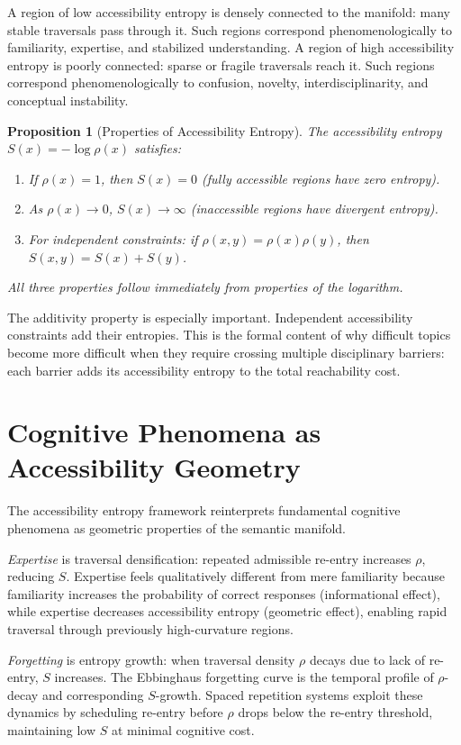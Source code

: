 \documentclass[12pt,oneside]{book}
\theoremstyle{plain}
\newtheorem{proposition}[theorem]{Proposition}
\theoremstyle{definition}
\theoremstyle{plain}
\begin{document}
A region of low accessibility entropy is densely connected to the manifold: many stable traversals pass through it. Such regions correspond phenomenologically to familiarity, expertise, and stabilized understanding. A region of high accessibility entropy is poorly connected: sparse or fragile traversals reach it. Such regions correspond phenomenologically to confusion, novelty, interdisciplinarity, and conceptual instability.

\begin{proposition}[Properties of Accessibility Entropy]
The accessibility entropy $S(x) = -\log\rho(x)$ satisfies:
\begin{enumerate}[noitemsep]
\item If $\rho(x) = 1$, then $S(x) = 0$ (fully accessible regions have zero entropy).
\item As $\rho(x) \to 0$, $S(x) \to \infty$ (inaccessible regions have divergent entropy).
\item For independent constraints: if $\rho(x,y) = \rho(x)\rho(y)$, then $S(x,y) = S(x) + S(y)$.
\end{enumerate}
All three properties follow immediately from properties of the logarithm.
\end{proposition}

The additivity property is especially important. Independent accessibility constraints add their entropies. This is the formal content of why difficult topics become more difficult when they require crossing multiple disciplinary barriers: each barrier adds its accessibility entropy to the total reachability cost.

\section{Cognitive Phenomena as Accessibility Geometry}

The accessibility entropy framework reinterprets fundamental cognitive phenomena as geometric properties of the semantic manifold.

\emph{Expertise} is traversal densification: repeated admissible re-entry increases $\rho$, reducing $S$. Expertise feels qualitatively different from mere familiarity because familiarity increases the probability of correct responses (informational effect), while expertise decreases accessibility entropy (geometric effect), enabling rapid traversal through previously high-curvature regions.

\emph{Forgetting} is entropy growth: when traversal density $\rho$ decays due to lack of re-entry, $S$ increases. The Ebbinghaus forgetting curve is the temporal profile of $\rho$-decay and corresponding $S$-growth. Spaced repetition systems exploit these dynamics by scheduling re-entry before $\rho$ drops below the re-entry threshold, maintaining low $S$ at minimal cognitive cost.
\end{document}
